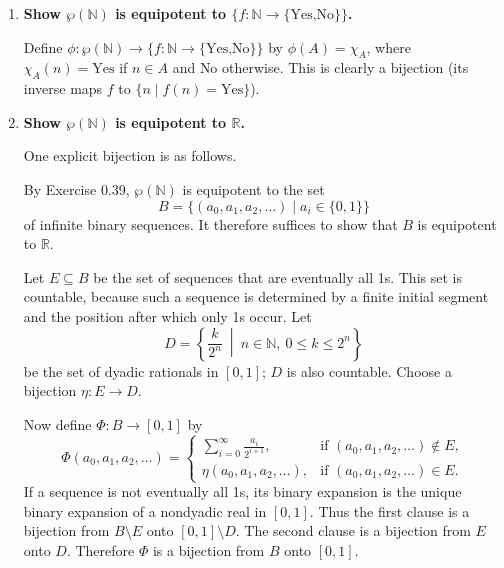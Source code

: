 \documentclass[11pt,openany]{book}
\def\NN{\mathbb{N}}
\def\RN{\mathbb{R}}
\def\QN{\mathbb{Q}}
\begin{document}
\begin{enumerate}[{0.}1. ]
Now define $f:\NN\to\QN$ by
\[
f(0)=0,\qquad
f(2n-1)=h(n),\qquad
f(2n)=-h(n)\quad(n\ge 1).
\]
Then $f$ lists $0$, then the positive rationals, then their negatives:
\[
0,\ h(1),\ -h(1),\ h(2),\ -h(2),\ldots
\]
Hence $f$ is a bijection from $\NN$ onto $\QN$, so $\NN$ and $\QN$ are equipotent.

\item \textbf{Show $\wp(\NN)$ is equipotent to $\{f:\NN\to\{\text{Yes,No}\}\}$.}

Define $\phi: \wp(\NN)\to\{f:\NN\to\{\text{Yes,No}\}\}$ by $\phi(A) = \chi_A$, where $\chi_A(n)=\text{Yes}$ if $n\in A$ and $\text{No}$ otherwise. This is clearly a bijection (its inverse maps $f$ to $\{n\mid f(n)=\text{Yes}\}$).

\item \textbf{Show $\wp(\NN)$ is equipotent to $\RN$.}

One explicit bijection is as follows.

By Exercise 0.39, $\wp(\NN)$ is equipotent to the set
\[
B=\{(a_0,a_1,a_2,\ldots)\mid a_i\in\{0,1\}\}
\]
of infinite binary sequences. It therefore suffices to show that $B$ is equipotent
to $\RN$.

Let $E\subseteq B$ be the set of sequences that are eventually all 1s. This set is
countable, because such a sequence is determined by a finite initial segment and
the position after which only 1s occur. Let
\[
D=\left\{\frac{k}{2^n}\ \middle|\ n\in\NN,\ 0\le k\le 2^n\right\}
\]
be the set of dyadic rationals in $[0,1]$; $D$ is also countable. Choose a
bijection $\eta:E\to D$.

Now define $\Phi:B\to[0,1]$ by
\[
\Phi(a_0,a_1,a_2,\ldots)=
\begin{cases}
\displaystyle \sum_{i=0}^{\infty}\frac{a_i}{2^{i+1}}, & \text{if }(a_0,a_1,a_2,\ldots)\notin E,\\[1.2ex]
\eta(a_0,a_1,a_2,\ldots), & \text{if }(a_0,a_1,a_2,\ldots)\in E.
\end{cases}
\]
If a sequence is not eventually all 1s, its binary expansion is the unique binary
expansion of a nondyadic real in $[0,1]$. Thus the first clause is a bijection
from $B\setminus E$ onto $[0,1]\setminus D$. The second clause is a bijection from
$E$ onto $D$. Therefore $\Phi$ is a bijection from $B$ onto $[0,1]$.


\end{enumerate}
\end{document}
